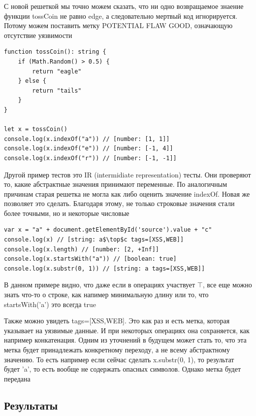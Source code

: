 С новой решеткой мы точно можем сказать, что ни одно возвращаемое знаение функции tossCoin не равно edge, а следовательно мертвый код игнорируется. Потому можем поставить метку POTENTIAL FLAW GOOD, означающую отсутствие уязвимости

\newpage
\begin{lstlisting}[caption={Пример IR тестов}]
function tossCoin(): string {
    if (Math.Random() > 0.5) {
        return "eagle"
    } else {
        return "tails"
    }
}

let x = tossCoin()
console.log(x.indexOf("a")) // [number: [1, 1]]
console.log(x.indexOf("e")) // [number: [-1, 4]]
console.log(x.indexOf("r")) // [number: [-1, -1]]
\end{lstlisting}

Другой пример тестов это IR (intermidiate representation) тесты. Они проверяют то, какие абстрактные значения принимают переменные. По аналогичным причинам старая решетка не могла как либо оценить значение indexOf. Новая же позволяет это сделать. Благодаря этому, не только строковые значения стали более точными, но и некоторые числовые


\begin{lstlisting}[mathescape=true, caption={Еще пример IR тестов}]
var x = "a" + document.getElementById('source').value + "c"
console.log(x) // [string: a$\top$c tags=[XSS,WEB]]
console.log(x.length) // [number: [2, +Inf]]
console.log(x.startsWith("a")) // [boolean: true]
console.log(x.substr(0, 1)) // [string: a tags=[XSS,WEB]]
\end{lstlisting}

В данном примере видно, что даже если в операциях участвует $\top$, все еще можно знать что-то о строке, как напимер минимальную длину или то, что startsWith('a') это всегда true

Также можно увидеть tags=[XSS,WEB]. Это как раз и есть метка, которая указывает на уязвимые данные. И при некоторых операциях она сохраняется, как например конкатенация. Одним из уточнений в будущем может стать то, что эта метка будет принадлежать конкретному переходу, а не всему абстрактному значению. То есть например если сейчас сделать x.substr(0, 1), то результат будет 'a', то есть вообще не содержать опасных символов. Однако метка будет передана


\newpage
\subsection{Результаты}